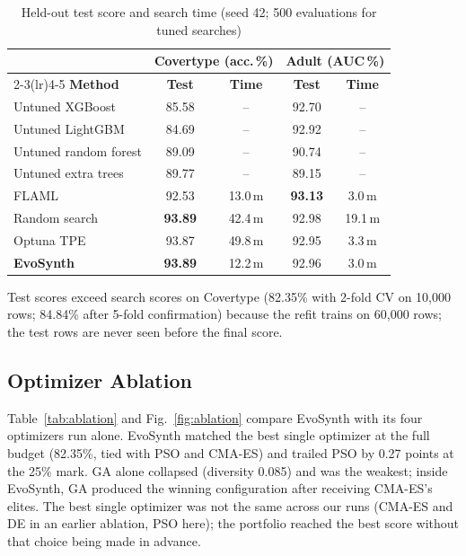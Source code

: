 \documentclass[conference]{IEEEtran}
\begin{document}
\begin{table}[t]
\caption{Held-out test score and search time (seed 42; 500 evaluations for tuned searches)}
\label{tab:main}
\centering
\setlength{\tabcolsep}{4pt}
\begin{tabular}{lcccc}
\toprule
 & \multicolumn{2}{c}{\textbf{Covertype (acc.\,\%)}} & \multicolumn{2}{c}{\textbf{Adult (AUC\,\%)}} \\
\cmidrule(lr){2-3}\cmidrule(lr){4-5}
\textbf{Method} & \textbf{Test} & \textbf{Time} & \textbf{Test} & \textbf{Time} \\
\midrule
Untuned XGBoost & 85.58 & -- & 92.70 & -- \\
Untuned LightGBM & 84.69 & -- & 92.92 & -- \\
Untuned random forest & 89.09 & -- & 90.74 & -- \\
Untuned extra trees & 89.77 & -- & 89.15 & -- \\
FLAML & 92.53 & 13.0\,m & \textbf{93.13} & 3.0\,m \\
Random search & \textbf{93.89} & 42.4\,m & 92.98 & 19.1\,m \\
Optuna TPE & 93.87 & 49.8\,m & 92.95 & 3.3\,m \\
\textbf{EvoSynth} & \textbf{93.89} & 12.2\,m & 92.96 & 3.0\,m \\
\bottomrule
\end{tabular}
\end{table}

Test scores exceed search scores on Covertype (82.35\% with 2-fold CV on 10,000 rows; 84.84\% after 5-fold confirmation) because the refit trains on 60,000 rows; the test rows are never seen before the final score.

\subsection{Optimizer Ablation}
Table~\ref{tab:ablation} and Fig.~\ref{fig:ablation} compare EvoSynth with its four optimizers run alone. EvoSynth matched the best single optimizer at the full budget (82.35\%, tied with PSO and CMA-ES) and trailed PSO by 0.27 points at the 25\% mark. GA alone collapsed (diversity 0.085) and was the weakest; inside EvoSynth, GA produced the winning configuration after receiving CMA-ES's elites. The best single optimizer was not the same across our runs (CMA-ES and DE in an earlier ablation, PSO here); the portfolio reached the best score without that choice being made in advance.
\end{document}
